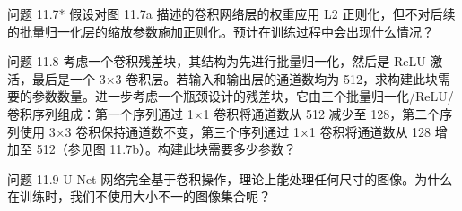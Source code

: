 问题 11.7* 假设对图 11.7a 描述的卷积网络层的权重应用 L2 正则化，但不对后续的批量归一化层的缩放参数施加正则化。预计在训练过程中会出现什么情况？

问题 11.8 考虑一个卷积残差块，其结构为先进行批量归一化，然后是 ReLU 激活，最后是一个 3×3 卷积层。若输入和输出层的通道数均为 512，求构建此块需要的参数数量。进一步考虑一个瓶颈设计的残差块，它由三个批量归一化/ReLU/卷积序列组成：第一个序列通过 1×1 卷积将通道数从 512 减少至 128，第二个序列使用 3×3 卷积保持通道数不变，第三个序列通过 1×1 卷积将通道数从 128 增加至 512（参见图 11.7b）。构建此块需要多少参数？

问题 11.9 U-Net 网络完全基于卷积操作，理论上能处理任何尺寸的图像。为什么在训练时，我们不使用大小不一的图像集合呢？
